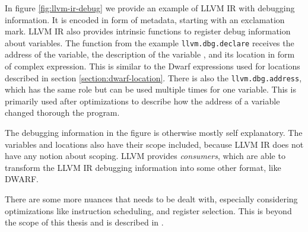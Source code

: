 In figure \ref{fig:llvm-ir-debug} we provide an example of LLVM IR with
debugging information. It is encoded in form of metadata, starting with an
exclamation mark. LLVM IR also provides intrinsic functions to register debug
information about variables. The function from the example
\texttt{llvm.dbg.declare} receives the address of the variable, the description
of the variable , and its location in form of complex expression. This is
similar to the Dwarf expressions used for locations described in section
\ref{section:dwarf-location}. There is also the \texttt{llvm.dbg.address},
which has the same role but can be used multiple times for one variable. This
is primarily used after optimizations to describe how the address of a variable
changed thorough the program.

The debugging information in the figure is otherwise mostly self explanatory.
The variables and locations also have their scope included, because LLVM IR
does not have any notion about scoping. LLVM provides \textit{consumers}, which
are able to transform the LLVM IR debugging information into some other format,
like DWARF.

There are some more nuances that needs to be dealt with, especially considering
optimizations like instruction scheduling, and register selection. This is
beyond the scope of this thesis and is described in \cite{llvm-debug-info}.

